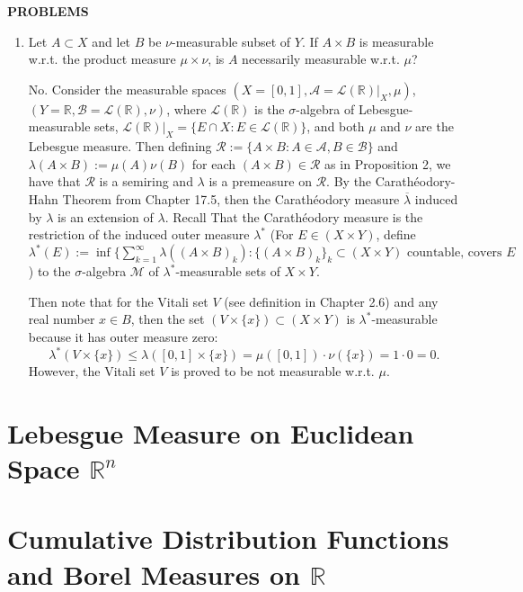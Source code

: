 \begin{center}
	\textbf{PROBLEMS}
\end{center}
\begin{enumerate}
	\setcounter{enumi}{0}
    \item Let $A\subset X$ and let $B$ be $\nu$-measurable subset of $Y$.
    If $A\times B$ is measurable w.r.t. the product measure $\mu\times\nu$, is $A$ necessarily measurable w.r.t. $\mu$?
    
    No.
    Consider the measurable spaces $(X=[0,1],\mathcal{A}=\mathcal{L}(\mathbb{R})|_X,\mu)$, $(Y=\mathbb{R},\mathcal{B}=\mathcal{L}(\mathbb{R}),\nu)$, where $\mathcal{L}(\mathbb{R})$ is the $\sigma$-algebra of Lebesgue-measurable sets, $\mathcal{L}(\mathbb{R})|_X=\{E\cap X:E\in\mathcal{L}(\mathbb{R})\}$, and both $\mu$ and $\nu$ are the Lebesgue measure.
    Then defining $\mathcal{R}:=\{A\times B:A\in\mathcal{A},B\in\mathcal{B}\}$ and $\lambda(A\times B):=\mu(A)\nu(B)$ for each $(A\times B)\in\mathcal{R}$ as in Proposition 2, we have that $\mathcal{R}$ is a semiring and $\lambda$ is a premeasure on $\mathcal{R}$.
    By the Carath\'eodory-Hahn Theorem from Chapter 17.5, then the Carath\'eodory measure $\overline\lambda$ induced by $\lambda$ is an extension of $\lambda$.
    Recall That the Carath\'eodory measure is the restriction of the induced outer measure $\lambda^*$ (For $E\in(X\times Y)$, define $\lambda^*(E):=\inf\{\sum_{k=1}^\infty\lambda((A\times B)_k):\{(A\times B)_k\}_k\subset (X\times Y)\text{ countable, covers }E $) to the $\sigma$-algebra $\mathcal{M}$ of $\lambda^*$-measurable sets of $X\times Y$.
    
    Then note that for the Vitali set $V$ (see definition in Chapter 2.6) and any real number $x\in B$, then the set $(V\times \{x\})\subset(X\times Y)$ is $\lambda^*$-measurable because it has outer measure zero: 
    \[
        \lambda^*(V\times\{x\})\le\lambda([0,1]\times\{x\})=\mu([0,1])\cdot\nu(\{x\})=1\cdot0=0.
    \]
    However, the Vitali set $V$ is proved to be not measurable w.r.t. $\mu$.

\end{enumerate}

\section{Lebesgue Measure on Euclidean Space $\mathbb{R}^n$}

\section{Cumulative Distribution Functions and Borel Measures on $\mathbb{R}$}

